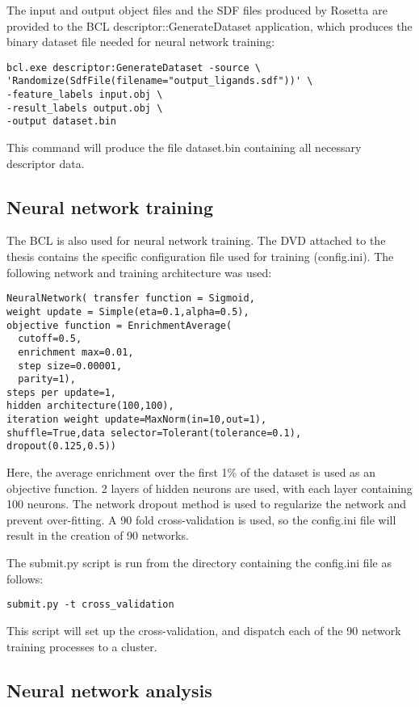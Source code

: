The input and output object files and the SDF files produced by Rosetta are provided to the BCL descriptor::GenerateDataset application, which produces the binary dataset file needed for neural network training:
\singlespace
\begin{verbatim}
bcl.exe descriptor:GenerateDataset -source \
'Randomize(SdfFile(filename="output_ligands.sdf"))' \
-feature_labels input.obj \
-result_labels output.obj \
-output dataset.bin
\end{verbatim}
\doublespace

This command will produce the file dataset.bin containing all necessary descriptor data.

\subsection{Neural network training}

The BCL is also used for neural network training.
The DVD attached to the thesis contains the specific configuration file used for training (config.ini).
The following network and training architecture was used:
\singlespace
\begin{verbatim}
NeuralNetwork( transfer function = Sigmoid,
weight update = Simple(eta=0.1,alpha=0.5),
objective function = EnrichmentAverage(
  cutoff=0.5,
  enrichment max=0.01,
  step size=0.00001,
  parity=1),
steps per update=1, 
hidden architecture(100,100),
iteration weight update=MaxNorm(in=10,out=1),
shuffle=True,data selector=Tolerant(tolerance=0.1),
dropout(0.125,0.5))
\end{verbatim}
\doublespace
Here, the average enrichment over the first 1\% of the dataset is used as an objective function.
2 layers of hidden neurons are used, with each layer containing 100 neurons. 
The network dropout method\citep{Hinton:2012tv} is used to regularize the network and prevent over-fitting.
A 90 fold cross-validation is used, so the config.ini file will result in the creation of 90 networks.

The submit.py script is run from the directory containing the config.ini file as follows:
\singlespace
\begin{verbatim}
submit.py -t cross_validation
\end{verbatim}
\doublespace
This script will set up the cross-validation, and dispatch each of the 90 network training processes to a cluster.
\subsection{Neural network analysis}

